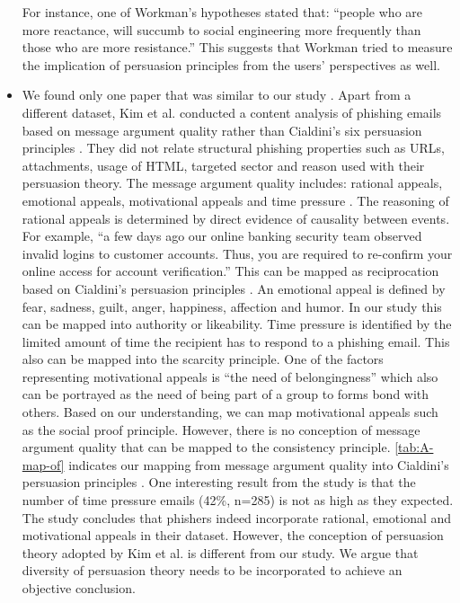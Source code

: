 \begin{itemize}
For instance, one of Workman's hypotheses stated that: ``people who
are more reactance, will succumb to social engineering more frequently
than those who are more resistance.'' This suggests that Workman
tried to measure the implication of persuasion principles from the
users' perspectives as well. 
\item We found only one paper that was similar to our study \citep{kim2013understanding}.
Apart from a different dataset, Kim et al. conducted a content analysis
of phishing emails based on message argument quality rather than Cialdini's
six persuasion principles \citep{kim2013understanding}\citep{cialdini:2001}.
They did not relate structural phishing properties such as URLs, attachments,
usage of HTML, targeted sector and reason used with their persuasion
theory. The message argument quality includes: rational appeals, emotional
appeals, motivational appeals and time pressure \citep{kim2013understanding}.
The reasoning of rational appeals is determined by direct evidence
of causality between events. For example, \textquotedblleft a few
days ago our online banking security team observed invalid logins
to customer accounts. Thus, you are required to re-confirm your online
access for account verification.\textquotedblright{} This can be mapped
as reciprocation based on Cialdini's persuasion principles \citep{cialdini:2001}.
An emotional appeal is defined by fear, sadness, guilt, anger, happiness,
affection and humor. In our study this can be mapped into authority
or likeability. Time pressure is identified by the limited amount
of time the recipient has to respond to a phishing email. This also
can be mapped into the scarcity principle. One of the factors representing
motivational appeals is ``the need of belongingness'' which also
can be portrayed as the need of being part of a group to forms bond
with others. Based on our understanding, we can map motivational appeals
such as the social proof principle. However, there is no conception
of message argument quality that can be mapped to the consistency
principle. \autoref{tab:A-map-of} indicates our mapping from message
argument quality into Cialdini's persuasion principles \citep{cialdini:2001}.
One interesting result from the study is that the number of time pressure
emails (42\%, n=285) is not as high as they expected. The study concludes
that phishers indeed incorporate rational, emotional and motivational
appeals in their dataset. However, the conception of persuasion theory
adopted by Kim et al. is different from our study. We argue that diversity
of persuasion theory needs to be incorporated to achieve an objective
conclusion. 
\end{itemize}

